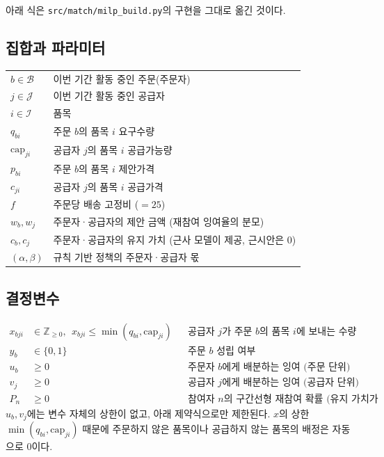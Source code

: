 \documentclass[11pt,a4paper]{article}
\begin{document}
아래 식은 \texttt{src/match/milp\_build.py}의 구현을 그대로 옮긴 것이다.

\subsection{집합과 파라미터}

\begin{tabularx}{\linewidth}{lY}
$b \in \mathcal{B}$ & 이번 기간 활동 중인 주문(주문자)\\
$j \in \mathcal{J}$ & 이번 기간 활동 중인 공급자\\
$i \in \mathcal{I}$ & 품목\\
$q_{bi}$ & 주문 $b$의 품목 $i$ 요구수량\\
$\mathrm{cap}_{ji}$ & 공급자 $j$의 품목 $i$ 공급가능량\\
$p_{bi}$ & 주문 $b$의 품목 $i$ 제안가격 \\
$c_{ji}$ & 공급자 $j$의 품목 $i$ 공급가격\\
$f$ & 주문당 배송 고정비 ($=25$)\\
$w_b, w_j$ & 주문자·공급자의 제안 금액 (재참여 잉여율의 분모)\\
$c_b, c_j$ & 주문자·공급자의 유지 가치 (근사 모델이 제공, 근시안은 0)\\
$(\alpha,\beta)$ & 규칙 기반 정책의 주문자·공급자 몫\\
\end{tabularx}

\subsection{결정변수}

\begin{align*}
  x_{bji} &\in \mathbb{Z}_{\ge 0},\ \ x_{bji}\le \min(q_{bi},\mathrm{cap}_{ji}) && \text{공급자 $j$가 주문 $b$의 품목 $i$에 보내는 수량}\\
  y_b &\in \{0,1\} && \text{주문 $b$ 성립 여부}\\
  u_b &\ge 0 && \text{주문자 $b$에게 배분하는 잉여 (주문 단위)}\\
  v_j &\ge 0 && \text{공급자 $j$에게 배분하는 잉여 (공급자 단위)}\\
  P_n &\ge 0 && \text{참여자 $n$의 구간선형 재참여 확률 (유지 가치가 주어질 때만)}
\end{align*}
$u_b, v_j$에는 변수 자체의 상한이 없고, 아래 제약식으로만 제한된다.
$x$의 상한 $\min(q_{bi},\mathrm{cap}_{ji})$ 때문에 주문하지 않은 품목이나 공급하지 않는 품목의 배정은 자동으로 0이다.
\end{document}
